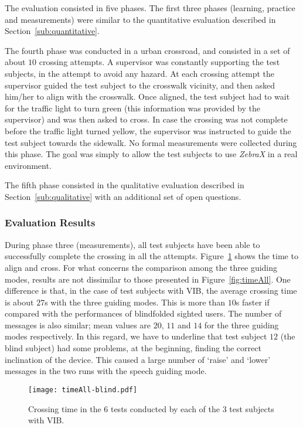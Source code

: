 \documentclass{article}
\newcommand{\zebra}{\emph{ZebraX}}
\begin{document}
The evaluation consisted in five phases. The first three phases (learning, practice and measurements) were similar to the quantitative evaluation described in Section~\ref{sub:quantitative}.

The fourth phase was conducted in a urban crossroad, and consisted in a set of about $10$ crossing attempts. A supervisor was constantly supporting the test subjects, in the attempt to avoid any hazard. At each crossing attempt the supervisor guided the test subject to the crosswalk vicinity, and then asked him/her to align with the crosswalk. Once aligned, the test subject had to wait for the traffic light to turn green (this information was provided by the supervisor) and was then asked to cross. In case the crossing was not complete before the traffic light turned yellow, the supervisor was instructed to guide the test subject towards the sidewalk. No formal measurements were collected during this phase. The goal was simply to allow the test subjects to use \zebra{} in a real environment.

The fifth phase consisted in the qualitative evaluation described in Section~\ref{sub:qualitative} with an additional set of open questions.

\subsubsection{Evaluation Results}
During phase three (measurements), all test subjects have been able to successfully complete the crossing in all the attempts.
Figure~\ref{fig:timeAll-blind} shows the time to align and cross. 
For what concerns the comparison among the three guiding modes, results are not dissimilar to those presented in Figure~\ref{fig:timeAll}.
One difference is that, in the case of test subjects with VIB, the average crossing time is about $27$s with the three guiding modes. This is more than $10$s faster if compared with the performances of blindfolded sighted users.
The number of messages is also similar; mean values are $20$, $11$ and $14$ for the three guiding modes respectively. In this regard, we have to underline that test subject $12$ (the blind subject) had some problems, at the beginning, finding the correct inclination of the device. This caused a large number of `raise' and `lower' messages in the two runs with the speech guiding mode.

\begin{figure}[t!]
	\centering
		\texttt{[image: timeAll-blind.pdf]}
	\caption[]{Crossing time in the $6$ tests conducted by each of the $3$ test subjects with VIB.}
	\label{fig:timeAll-blind}
\end{figure}
\end{document}
